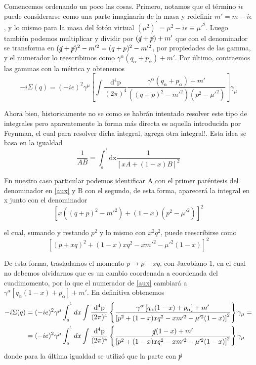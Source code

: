 \documentclass{article}
\numberwithin{equation}{section}
\begin{document}
Comencemos ordenando un poco las cosas. Primero, notamos que el término
$i\epsilon$ puede considerarse como una parte imaginaria de la masa
y redefinir $m'=m-i\epsilon$, y lo mismo para la masa del fotón virtual $\left(\mu^{2}\right)^{'}=\mu^{2}-i\epsilon\equiv\mu'^{2}$.
Luego también podemos multiplicar y dividir por $(\cancel{q}+\cancel{p})+m'$
que con el denominador se transforma en $(\cancel{q}+\cancel{p})^{2}-m'^{2}=(q+p)^{2}-m'^{2}$,
por propiedades de las gamma, y el numerador lo reescribimos como
$\gamma^{\alpha}(q_{\alpha}+p_{\alpha})+m'$. Por último, contraemos
las gammas con la métrica y obtenemos
\begin{equation}\label{aux}
-i\Sigma(q)=(-ie)^{2}\gamma^{\mu}\left[\int\frac{\mathrm{d^{4}p}}{(2\pi)^{4}}\frac{\gamma^{\alpha}(q_{\alpha}+p_{\alpha})+m'}{\left((q+p)^{2}-m'^{2}\right)\left(p^{2}-\mu'^{2}\right)}\right]\gamma_{\mu}
\end{equation}

Ahora bien, historicamente no se como se habrán intentado resolver
este tipo de integrales pero aparentemente la forma más directa es
aquella introducida por Feynman, el cual para resolver dicha integral,
agrega otra integral!. Esta idea se basa en la igualdad
\begin{equation}
\frac{1}{AB}=\int_{_{0}}^{^{1}}\mathrm{dx}\frac{1}{\left[xA+(1-x)B\right]^{2}}
\end{equation}

En nuestro caso particular podemos identificar A con el primer paréntesis
del denominador en \ref{aux} y B con el segundo, de esta forma, aparecerá
la integral en x junto con el denominador
\begin{equation}
\left[x\left((q+p)^{2}-m'^{2}\right)+(1-x)\left(p^{2}-\mu'^{2}\right)\right]^{2}
\end{equation}

el cual, sumando y restando $ p^2 $ y lo mismo con $ x^2q^2 $, puede reescribirse como 
\begin{equation}
\left[\left(p+xq\right)^{2}+(1-x)xq^{2}-xm'^{2}-\mu'^{2}(1-x)\right]^{2}
\end{equation}

De esta forma, trasladamos el momento $p \longrightarrow p - xq$, con Jacobiano
1, en el cual no debemos olvidarnos que es un cambio coordenada a
coordenada del cuadimomento, por lo que el numerador de \ref{aux} cambiará
a $\gamma^{\alpha}\left[q_{\alpha}(1-x)+p_{\alpha}\right]+m'$.
En definitiva obtenemos
\begin{equation}\label{aux1}
\begin{aligned}
-i\Sigma(q)&=(-ie)^{2}\gamma^{\mu}\int_{_{0}}^{^{1}}dx\int\frac{\mathrm{d^{4}p}}{(2\pi)^{4}}\left\{ \frac{\gamma^{\alpha}\left[q_{\alpha}(1-x)+p_{\alpha}\right]+m'}{\left[p^{2}+(1-x)xq^{2}-xm'^{2}-\mu'^{2}(1-x)\right]^{2}}\right\} \gamma_{\mu}=\\
&=(-ie)^{2}\gamma^{\mu}\int_{_{0}}^{^{1}}dx\int\frac{\mathrm{d^{4}p}}{(2\pi)^{4}}\left\{ \frac{\cancel{q}(1-x)+m'}{\left[p^{2}+(1-x)xq^{2}-xm'^{2}-\mu'^{2}(1-x)\right]^{2}}\right\} \gamma_{\mu}
\end{aligned}
\end{equation}
donde para la última igualdad se utilizó que la parte con $\cancel{p}$
\end{document}
